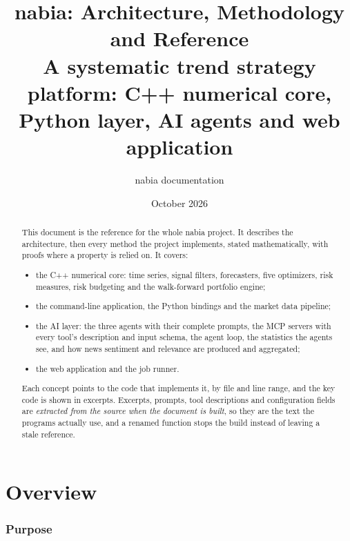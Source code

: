 \documentclass[11pt,a4paper]{article}
\title{nabia: Architecture, Methodology and Reference\\[0.3em]
\large A systematic trend strategy platform: C++ numerical core, Python layer, AI agents and web application}
\author{nabia documentation}
\date{October 2026}
\begin{document}
\maketitle

\begin{abstract}
This document is the reference for the whole nabia project. It describes the architecture,
then every method the project implements, stated mathematically, with proofs where a
property is relied on. It covers:
\begin{itemize}
  \item the C++ numerical core: time series, signal filters, forecasters, five optimizers,
        risk measures, risk budgeting and the walk-forward portfolio engine;
  \item the command-line application, the Python bindings and the market data pipeline;
  \item the AI layer: the three agents with their complete prompts, the MCP servers with
        every tool's description and input schema, the agent loop, the statistics the agents
        see, and how news sentiment and relevance are produced and aggregated;
  \item the web application and the job runner.
\end{itemize}
Each concept points to the code that implements it, by file and line range, and the key
code is shown in excerpts. Excerpts, prompts, tool descriptions and configuration fields
are \emph{extracted from the source when the document is built}, so they are the text the
programs actually use, and a renamed function stops the build instead of leaving a stale
reference.
\end{abstract}

\tableofcontents
\clearpage

\part{Overview}

\section{Purpose}
\end{document}
